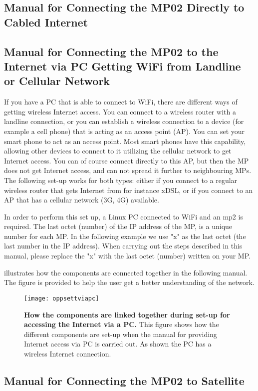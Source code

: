 \subsection{Manual for Connecting the MP02 Directly to Cabled Internet}
\label{subsec:cabledInternet}

\clearpage
\subsection{Manual for Connecting the MP02 to the Internet via PC Getting WiFi from Landline or Cellular Network}
\label{subsec:internetviaPC}

If you have a PC that is able to connect to WiFi, there are different ways of getting wireless Internet access. You can connect to a wireless router with a landline connection, or you can establish a wireless connection to a device (for example a cell phone) that is acting as an access point (AP). You can set your smart phone to act as an access point. Most smart phones have this capability, allowing other devices to connect to it utilizing the cellular network to get Internet access. You can of course connect directly to this AP, but then the MP does not get Internet access, and can not spread it further to neighbouring MPs. The following set-up works for both types: either if you connect to a regular wireless router that gets Internet from for instance xDSL, or if you connect to an AP that has a cellular network (3G, 4G) available. 

In order to perform this set up, a Linux PC connected to WiFi and an \gls{mp2} is required. The last octet (number) of the IP address of the MP, is a unique number for each MP. In the following example we use "x" as the last octet (the last number in the IP address). When carrying out the steps described in this manual, please replace the "x" with the last octet (number) written on your MP.

 illustrates how the components are connected together in the following manual. The figure is provided to help the user get a better understanding of the network. 

\begin{figure}[h!]
  \centering
      \texttt{[image: oppsettviapc]}
  \caption [How the components are linked together during set-up for accessing the Internet via a PC]{\textbf{How the components are linked together during set-up for accessing the Internet via a PC.} This figure shows how the different components are set-up when the manual for providing Internet access via PC is carried out. As shown the PC has a wireless Internet connection.}
  \label{fig:oppsettviapc}
\end{figure}


\clearpage

 
\clearpage
\subsection{Manual for Connecting the MP02 to Satellite}

\clearpage
